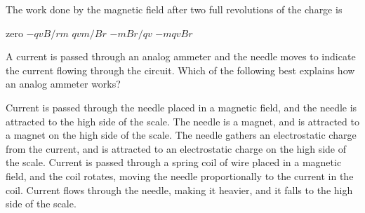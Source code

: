 \documentclass{../../oss-classkick-exam}
\begin{document}
\begin{multicols*}{2}
\begin{questions}
    \question The work done by the magnetic field after two full revolutions of
    the charge is
    \begin{choices}
      \choice zero
      \choice $-qvB/rm$
      \choice $qvm/Br$
      \choice $-mBr/qv$
      \choice $-mqvBr$
    \end{choices}
    \label{q:circ2}
    
    \question A current is passed through an analog ammeter and the needle moves
    to indicate the current flowing through the circuit. Which of the
    following best explains how an analog ammeter works?
    \begin{choices}
      \choice Current is passed through the needle placed in a magnetic field,
      and the needle is attracted to the high side of the scale.
      \choice The needle is a magnet, and is attracted to a magnet on the high
      side of the scale.
      \choice The needle gathers an electrostatic charge from the current, and
      is attracted to an electrostatic charge on the high side of the scale.
      \choice Current is passed through a spring coil of wire placed in a
      magnetic field, and the coil rotates, moving the needle
      proportionally to the current in the coil.
      \choice Current flows through the needle, making it heavier, and it falls
      to the high side of the scale.
    \end{choices}
    \vspace{.7in}
    
  \end{questions}
\end{multicols*}
\newpage


\genfreedirections

\begin{center}
\end{center}
\end{document}

